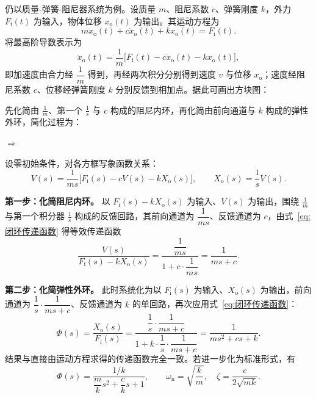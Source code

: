 \begin{longexample}[质量-弹簧-阻尼器系统的方块图化简]
\label{exam:方块图化简机械}
仍以质量-弹簧-阻尼器系统为例。设质量 $m$、阻尼系数 $c$、弹簧刚度 $k$，外力 $F_{\mathrm{i}}(t)$ 为输入，物体位移 $x_{\mathrm{o}}(t)$ 为输出。其运动方程为
\[
m\ddot{x}_{\mathrm{o}}(t)+c\dot{x}_{\mathrm{o}}(t)+kx_{\mathrm{o}}(t)=F_{\mathrm{i}}(t).
\]
将最高阶导数表示为
\[
\ddot{x}_{\mathrm{o}}(t)=\frac{1}{m}\bigl[F_{\mathrm{i}}(t)-c\dot{x}_{\mathrm{o}}(t)-kx_{\mathrm{o}}(t)\bigr],
\]
即加速度由合力经 $\dfrac{1}{m}$ 得到，再经两次积分分别得到速度 $v$ 与位移 $x_{\mathrm{o}}$；速度经阻尼系数 $c$、位移经弹簧刚度 $k$ 分别反馈到相加点。据此可画出方块图：

\begin{center}
\end{center}

先化简由 $\frac{1}{m}$、第一个 $\frac{1}{s}$ 与 $c$ 构成的阻尼内环，再化简由前向通道与 $k$ 构成的弹性外环，简化过程为：

\begin{center}
$\Longrightarrow$
\end{center}

\begin{solution}
设零初始条件，对各方框写象函数关系：
\[
V(s)=\frac{1}{ms}\bigl[F_{\mathrm{i}}(s)-cV(s)-kX_{\mathrm{o}}(s)\bigr],\qquad
X_{\mathrm{o}}(s)=\frac{1}{s}V(s).
\]

\textbf{第一步：化简阻尼内环。} 以 $F_{\mathrm{i}}(s)-kX_{\mathrm{o}}(s)$ 为输入、$V(s)$ 为输出，围绕 $\frac{1}{m}$ 与第一个积分器 $\frac{1}{s}$ 构成的反馈回路，其前向通道为 $\dfrac{1}{ms}$、反馈通道为 $c$，由式~\eqref{eq:闭环传递函数} 得等效传递函数
\[
\frac{V(s)}{F_{\mathrm{i}}(s)-kX_{\mathrm{o}}(s)}
=\frac{\dfrac{1}{ms}}{1+c\cdot\dfrac{1}{ms}}
=\frac{1}{ms+c}.
\]

\textbf{第二步：化简弹性外环。} 此时系统化为以 $F_{\mathrm{i}}(s)$ 为输入、$X_{\mathrm{o}}(s)$ 为输出，前向通道为 $\dfrac{1}{s}\cdot\dfrac{1}{ms+c}$、反馈通道为 $k$ 的单回路，再次应用式~\eqref{eq:闭环传递函数}：
\[
\Phi(s)=\frac{X_{\mathrm{o}}(s)}{F_{\mathrm{i}}(s)}
=\frac{\dfrac{1}{s}\cdot\dfrac{1}{ms+c}}
{1+k\cdot\dfrac{1}{s}\cdot\dfrac{1}{ms+c}}
=\frac{1}{ms^{2}+cs+k}.
\]
结果与直接由运动方程求得的传递函数完全一致。若进一步化为标准形式，有
\[
\Phi(s)=\frac{1/k}{\dfrac{m}{k}s^{2}+\dfrac{c}{k}s+1},
\qquad
\omega_{\mathrm{n}}=\sqrt{\frac{k}{m}},\quad
\zeta=\frac{c}{2\sqrt{mk}}.
\]
\end{solution}
\end{longexample}

